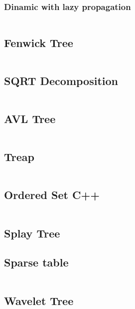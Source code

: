 \documentclass[11pt]{article}
\begin{document}
			\subsubsection{Dinamic with lazy propagation}
			\inputminted[tabsize=2,breaklines,firstline=39,lastline=90,fontsize=\small]{c++}{queries.cpp}
		
		\subsection{Fenwick Tree}
		\inputminted[tabsize=2,breaklines,firstline=92,lastline=129,fontsize=\small]{c++}{queries.cpp}
		
		\subsection{SQRT Decomposition}
		\inputminted[tabsize=2,breaklines,firstline=131,lastline=209,fontsize=\small]{c++}{queries.cpp}
		
		\subsection{AVL Tree}
		\inputminted[tabsize=2,breaklines,firstline=211,lastline=414,fontsize=\small]{c++}{queries.cpp}
		
		\subsection{Treap}
		\inputminted[tabsize=2,breaklines,firstline=416,lastline=653,fontsize=\small]{c++}{queries.cpp}
		
		\subsection{Ordered Set C++}
		\inputminted[tabsize=2,breaklines,firstline=757,lastline=790,fontsize=\small]{c++}{queries.cpp}
		
		\subsection{Splay Tree}
		
		
		\subsection{Sparse table}
		\inputminted[tabsize=2,breaklines,firstline=655,lastline=690,fontsize=\small]{c++}{queries.cpp}
		
		\subsection{Wavelet Tree}
		\inputminted[tabsize=2,breaklines,firstline=692,lastline=755,fontsize=\small]{c++}{queries.cpp}
		
\end{document}
